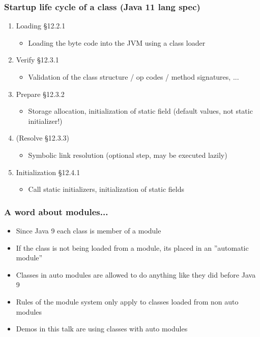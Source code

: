 \documentclass[aspectratio=169]{beamer}
\begin{document}
\begin{frame}
	\frametitle{Startup life cycle of a class (Java 11 lang spec)}
	\begin{enumerate}
		\item{Loading §12.2.1}
			\begin{itemize}
				\item{Loading the byte code into the JVM using a class loader}
			\end{itemize}
		\item{Verify §12.3.1}
			\begin{itemize}
				\item{Validation of the class structure / op codes / method signatures, ...}
			\end{itemize}
		\item{Prepare §12.3.2}
			\begin{itemize}
				\item{Storage allocation, initialization of static field (default values, not static initializer!)}
			\end{itemize}
		\item{(Resolve §12.3.3)}
			\begin{itemize}
				\item{Symbolic link resolution (optional step, may be executed lazily)}
			\end{itemize}
		\item{Initialization §12.4.1}
			\begin{itemize}
				\item{Call static initializers, initialization of static fields}
			\end{itemize}
	\end{enumerate}
\end{frame}

\begin{frame}
\frametitle{A word about modules...}
\begin{itemize}
    \item{Since Java 9 each class is member of a module}
    \item{If the class is not being loaded from a module, its placed in an ''automatic module''}
    \item{Classes in auto modules are allowed to do anything like they did before Java 9}
    \item{Rules of the module system only apply to classes loaded from non auto modules}
    \item{Demos in this talk are using classes with auto modules}
\end{itemize}
\end{frame}
\end{document}
